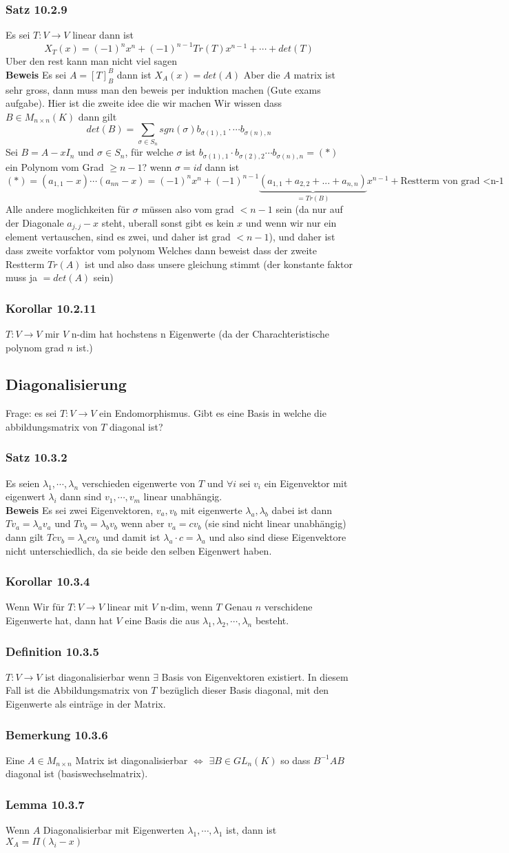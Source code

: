 \documentclass{article}
\newcommand{\satz}[1]{\subsubsection*{Satz {#1}}}
\newcommand{\korollar}[1]{\subsubsection*{Korollar {#1}}}
\newcommand{\beweis}{\\\textbf{Beweis }}
\newcommand{\bemerkung}[1]{\subsubsection*{Bemerkung {#1}}}
\newcommand{\lemma}[1]{\subsubsection*{Lemma {#1}}}
\newcommand{\definition}[1]{\subsubsection*{Definition {#1}}}
\begin{document}
\satz{10.2.9} Es sei $T:V\rightarrow V$ linear dann ist \[X_T(x)=(-1)^nx^n+(-1)^{n-1}Tr(T)x^{n-1}+\cdots+det(T)\] Uber den rest kann man nicht viel sagen\beweis
Es sei $A=[T]^B_B$ dann ist $X_A(x)=det(A)$ Aber die $A$ matrix ist sehr gross, dann muss man den beweis per induktion machen (Gute exams aufgabe). Hier ist die zweite idee die wir machen Wir wissen dass $B\in M_{n\times n}(K)$ dann gilt 
\[det(B)=\sum_{\sigma\in S_n}sgn(\sigma)b_{\sigma(1),1}\cdot\cdots b_{\sigma(n),n}\] Sei $B=A-xI_n$ und $\sigma\in S_n$, für welche $\sigma$ ist $b_{\sigma(1),1}\cdot b_{\sigma(2),2}\cdots b_{\sigma(n),n}=(*)$ ein Polynom vom Grad $\ge n-1$?
wenn $\sigma=id$ dann ist \[(*)=(a_{1,1}-x)\cdots(a_{nn}-x)=(-1)^nx^n+(-1)^{n-1}\underset{=Tr(B)}{\underbrace{(a_{1,1}+a_{2,2}+...+a_{n,n})}}x^{n-1}+\text{Restterm von grad <n-1}\] Alle andere moglichkeiten für $\sigma$ müssen also vom grad $<n-1$ sein (da nur auf der Diagonale $a_{j,j}-x$ steht, uberall sonst gibt es kein $x$ und wenn wir nur ein element vertauschen, sind es zwei, und daher ist grad $<n-1$), und daher ist dass zweite vorfaktor vom polynom
Welches dann beweist dass der zweite Restterm $Tr(A)$ ist und also dass unsere gleichung stimmt (der konstante faktor muss ja $=det(A)$ sein)
\korollar{10.2.11} $T:V\rightarrow V$ mir $V$ n-dim hat hochstens n Eigenwerte (da der Charachteristische polynom grad $n$ ist.)
\subsection{Diagonalisierung} Frage: es sei $T:V\rightarrow V$ ein Endomorphismus. Gibt es eine Basis in welche die abbildungsmatrix von $T$  diagonal ist?
\satz{10.3.2} Es seien $\lambda_1,\cdots,\lambda_n$ verschieden eigenwerte von $T$ und $\forall i$ sei $v_i$ ein Eigenvektor mit eigenwert $\lambda_i$ dann sind $v_1,\cdots,v_m$ linear unabhängig.
\beweis Es sei zwei Eigenvektoren, $v_a, v_b$ mit eigenwerte $\lambda_a,\lambda_b$ dabei ist dann $Tv_a=\lambda_av_a$ und $Tv_b=\lambda_bv_b$ wenn aber $v_a=cv_b$ (sie sind nicht linear unabhängig) dann gilt $Tcv_b=\lambda_acv_b$ und damit ist $\lambda_a\cdot c=\lambda_a$ und also sind diese Eigenvektore nicht unterschiedlich, da sie beide den selben Eigenwert haben.

\korollar{10.3.4} Wenn Wir für $T:V\rightarrow V$ linear mit $V$ n-dim, wenn $T$ Genau $n$ verschidene Eigenwerte hat, dann hat $V$ eine Basis die aus $\lambda_1,\lambda_2,\cdots,\lambda_n$ besteht.
\definition{10.3.5} $T:V\rightarrow V$ ist diagonalisierbar wenn $\exists$ Basis von Eigenvektoren existiert.
In diesem Fall ist die Abbildungsmatrix von $T$ bezüglich dieser Basis diagonal, mit den Eigenwerte als einträge in der Matrix.
\bemerkung{10.3.6} Eine $A\in M_{n\times n}$ Matrix ist diagonalisierbar $\Leftrightarrow$ $\exists B\in GL_n(K)$ so dass $B^{-1}AB$ diagonal ist (basiswechselmatrix).
 \lemma{10.3.7} Wenn $A$ Diagonalisierbar mit Eigenwerten $\lambda_1,\cdots,\lambda_1$ ist, dann ist $X_A=\Pi(\lambda_i-x)$
\end{document}
